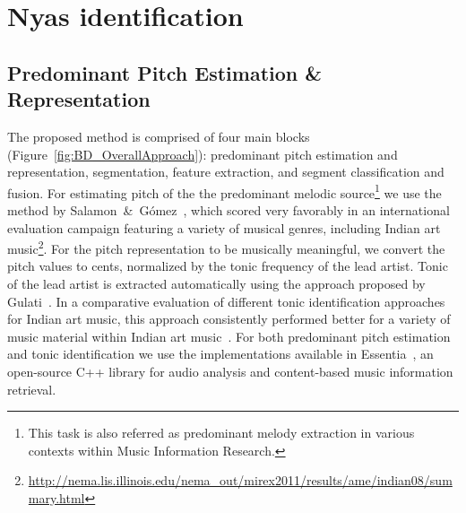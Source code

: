 {\section{Nyas identification}




\subsection{Predominant Pitch Estimation \& Representation}

The proposed method is comprised of four main blocks (Figure~\ref{fig:BD_OverallApproach}): predominant pitch estimation and representation, segmentation, feature extraction, and segment classification and fusion. For estimating pitch of the the predominant melodic source\footnote{This task is also referred as predominant melody extraction in various contexts within Music Information Research.} we use the method by Salamon~\&~G\'omez~\cite{Salamon2012}, which scored very favorably in an international evaluation campaign featuring a variety of musical genres, including Indian art music\footnote{\url{http://nema.lis.illinois.edu/nema_out/mirex2011/results/ame/indian08/summary.html}}. For the pitch representation to be musically meaningful, we convert the pitch values to cents, normalized by the tonic frequency of the lead artist. Tonic of the lead artist is extracted automatically using the approach proposed by Gulati~\cite{SGulati_MThesis2012}. In a comparative evaluation of different tonic identification approaches for Indian art music, this approach consistently performed better for a variety of music material within Indian art music~\cite{Gulati2013Tonic}. For both predominant pitch estimation and tonic identification we use the implementations available in Essentia~\cite{essentia}, an open-source C++ library for audio analysis and content-based music information retrieval.


}
